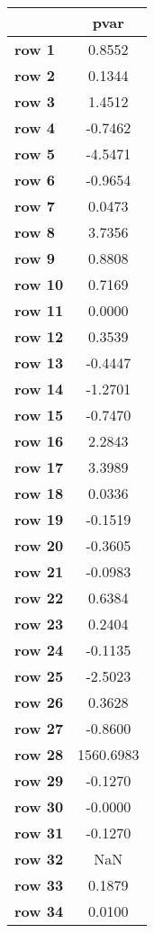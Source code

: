 \begin{tiny}\begin{tabular}{|l|c|}
\hline
&\textbf{pvar}\\\hline
\textbf{row 1}&0.8552\\\hline
\textbf{row 2}&0.1344\\\hline
\textbf{row 3}&1.4512\\\hline
\textbf{row 4}&-0.7462\\\hline
\textbf{row 5}&-4.5471\\\hline
\textbf{row 6}&-0.9654\\\hline
\textbf{row 7}&0.0473\\\hline
\textbf{row 8}&3.7356\\\hline
\textbf{row 9}&0.8808\\\hline
\textbf{row 10}&0.7169\\\hline
\textbf{row 11}&0.0000\\\hline
\textbf{row 12}&0.3539\\\hline
\textbf{row 13}&-0.4447\\\hline
\textbf{row 14}&-1.2701\\\hline
\textbf{row 15}&-0.7470\\\hline
\textbf{row 16}&2.2843\\\hline
\textbf{row 17}&3.3989\\\hline
\textbf{row 18}&0.0336\\\hline
\textbf{row 19}&-0.1519\\\hline
\textbf{row 20}&-0.3605\\\hline
\textbf{row 21}&-0.0983\\\hline
\textbf{row 22}&0.6384\\\hline
\textbf{row 23}&0.2404\\\hline
\textbf{row 24}&-0.1135\\\hline
\textbf{row 25}&-2.5023\\\hline
\textbf{row 26}&0.3628\\\hline
\textbf{row 27}&-0.8600\\\hline
\textbf{row 28}&1560.6983\\\hline
\textbf{row 29}&-0.1270\\\hline
\textbf{row 30}&-0.0000\\\hline
\textbf{row 31}&-0.1270\\\hline
\textbf{row 32}&NaN\\\hline
\textbf{row 33}&0.1879\\\hline
\textbf{row 34}&0.0100\\\hline

\end{tabular}
\end{tiny}
